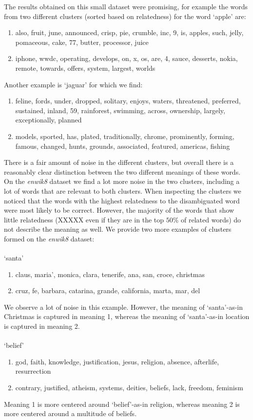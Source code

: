\documentclass[11pt]{article}
\begin{document}
The results obtained on this small dataset were promising, for example the words from two different clusters  (sorted based on relatedness) for the word `apple' are: 
\begin{enumerate}
\item also, fruit, june, announced, crisp, pie, crumble, inc, 9, is, apples, such, jelly, pomaceous, cake, 77, butter, processor, juice
\item iphone, wwdc, operating, develops, on, x, os, are, 4, sauce, desserts, nokia, remote, towards, offers, system, largest, worlds
\end{enumerate}
Another example is `jaguar' for which we find: 
\begin{enumerate}
\item feline, fords, under, dropped, solitary, enjoys, waters, threatened, preferred, sustained, inland, 59, rainforest, swimming, across, ownership, largely, exceptionally, planned
\item models, sported, has, plated, traditionally, chrome, prominently, forming, famous, changed, hunts, grounds, associated, featured, americas, fishing
\end{enumerate}
There is a fair amount of noise in the different clusters, but overall there is a reasonably clear distinction between the two different meanings of these words.
On the \textit{enwik8} dataset we find a lot more noise in the two clusters, including a lot of words that are relevant to both clusters. When inspecting the clusters we noticed that the words with the highest relatedness to the disambiguated word were most likely to be correct. However, the majority of the words that show little relatedness (XXXXX even if they are in the top $50\%$ of related words) do not describe the meaning as well. We provide two more examples of clusters formed on the \textit{enwik8} dataset:\\\\
`santa'
\begin{enumerate}
\item claus, maria', monica, clara, tenerife, ana, san, croce, christmas
\item cruz, fe, barbara, catarina, grande, california, marta, mar, del
\end{enumerate}
We observe a lot of noise in this example. However, the meaning of `santa'-as-in Christmas is captured in meaning 1, whereas the meaning of `santa'-as-in location is captured in meaning 2. \\\\
`belief'
\begin{enumerate}
\item god, faith, knowledge, justification, jesus, religion, absence, afterlife, resurrection
\item contrary, justified, atheism, systems, deities, beliefs, lack, freedom, feminism
\end{enumerate}
Meaning 1 is more centered around `belief'-as-in religion, whereas meaning 2 is more centered around a multitude of beliefs. 
\end{document}
